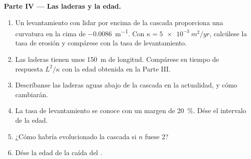 \begin{problem}
\medskip\noindent\textbf{Parte IV --- Las laderas y la edad.}
\begin{enumerate}[resume]
\item Un levantamiento con lidar por encima de la cascada proporciona una curvatura en la cima de
  \qty{-0.0086}{m^{-1}}. Con $\kappa = \qty{5e-3}{m^2/yr}$, calcúlese la
  tasa de erosión y compárese con la tasa de levantamiento.
\item Las laderas tienen unos \qty{150}{m} de longitud. Compárese su tiempo de respuesta
  $L^2/\kappa$ con la edad obtenida en la Parte III.
\item Descríbanse las laderas aguas abajo de la cascada en la actualidad, y
  cómo cambiarán.
\item La tasa de levantamiento se conoce con un margen de \qty{20}{\percent}. Dése el intervalo de la
  edad.
\item ¿Cómo habría evolucionado la cascada si $n$ fuese 2?
\item Dése la edad de la caída del .
\end{enumerate}
\end{problem}

